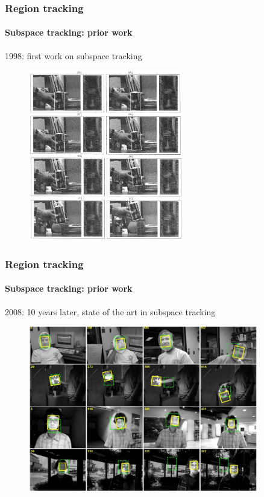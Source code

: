 \begin{frame}
\frametitle{Region tracking}
\framesubtitle{Subspace tracking: prior work}
\logoCSIPCPL\mypagenum
\vspace{0.1in}
1998: first work on subspace tracking
	\begin{figure}
		\includegraphics[width=0.6\textwidth]{thesis/TrackingPapers_SubspaceTracking_1998_Black_fig9.png}
	\end{figure}
\end{frame}



\begin{frame}
\frametitle{Region tracking}
\framesubtitle{Subspace tracking: prior work}
\logoCSIPCPL\mypagenum
\vspace{0.1in}
2008: 10 years later, state of the art in subspace tracking
\begin{figure}
\includegraphics[width=0.9\textwidth]{thesis/TrackingPapers_SubspaceTracking_2008_Ross_fig10.png}
\end{figure}
\end{frame}






